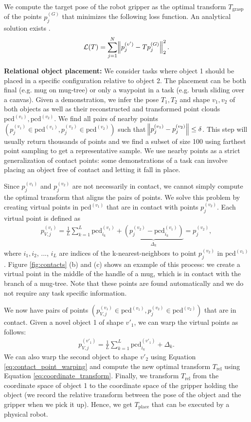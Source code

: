 \documentclass{article}
\newcommand{\pcx}[1]{\mathrm{pcd}^{(#1)}}
\begin{document}
We compute the target pose of the robot gripper as the optimal transform $T_{\text{grasp}}$ of the points $p^{(G)}_j$ that minimizes the following loss function. An analytical solution exists \cite{horn88computation}.
\begin{align}
    \mathcal{L}(T) = \sum_{j=1}^N \norm{ p^{(v')}_j - T p^{(G)}_j }_2^2. \label{eq:coordinate_transform}
\end{align}

\textbf{Relational object placement:} We consider tasks where object 1 should be placed in a specific configuration relative to object 2. The placement can be both final (e.g. mug on mug-tree) or only a waypoint in a task (e.g. brush sliding over a canvas). Given a demonstration, we infer the pose $T_1, T_2$ and shape $v_1, v_2$ of both objects as well as their reconstructed and transformed point clouds $\pcx{v_1}, \pcx{v_2}$. We find all pairs of nearby points $(p^{(v_1)}_j \in \pcx{v_1}, p^{(v_2)}_j \in \pcx{v_2})$ such that $\norm{p^{(v_1)}_j - p^{(v_2)}_j} \leq \delta$. This step will usually return thousands of points and we find a subset of size 100 using farthest point sampling \cite{eldar94farthest} to get a representative sample. We use nearby points as a strict generalization of contact points: some demonstrations of a task can involve placing an object free of contact and letting it fall in place.

Since $p^{(v_1)}_j$ and $p^{(v_2)}_j$ are not necessarily in contact, we cannot simply compute the optimal transform that aligns the pairs of points. We solve this problem by creating virtual points in $\pcx{v_1}$ that are in contact with points $p^{(v_2)}_j$. Each virtual point is defined as
\begin{align}
    p^{(v_1)}_{V,j} = \frac{1}{L} \sum_{k=1}^L \pcx{v_1}_{i_k} + \underbrace{(p^{(v_2)}_j - \pcx{v_1}_{i_k})}_{\Delta_k} = p^{(v_2)}_j,
\end{align}
where $i_1, i_2$, ..., $i_L$ are indices of the k-nearest-neighbors to point $p^{(v_2)}_j$ in $\pcx{v_1}$. Figure \ref{fig:contacts} (b) and (c) shows an example of this process: we create a virtual point in the middle of the handle of a mug, which is in contact with the branch of a mug-tree. Note that these points are found automatically and we do not require any task specific information.

We now have pairs of points $(p^{(v_1)}_{V,j} \in \pcx{v_1}, p^{(v_2)}_j \in \pcx{v_2})$ that are in contact. Given a novel object 1 of shape $v'_1$, we can warp the virtual points as follows:
\begin{align}
    p^{(v'_1)}_{V,j} = \frac{1}{L} \sum_{k=1}^L \pcx{v'_1}_{i_k} + \Delta_k.
\end{align}
We can also warp the second object to shape $v'_2$ using Equation \ref{eq:contact_point_warping} and compute the new optimal transform $T_{\text{rel}}$ using Equation \ref{eq:coordinate_transform}. Finally, we transform $T_{\text{rel}}$ from the coordinate space of object 1 to the coordinate space of the gripper holding the object (we record the relative transform between the pose of the object and the gripper when we pick it up). Hence, we get $T_{\text{place}}$ that can be executed by a physical robot.
\end{document}
